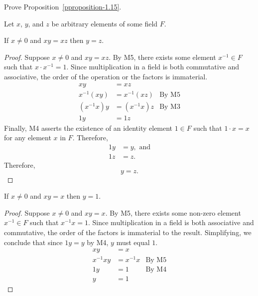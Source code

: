 \begin{exercise}
	Prove Proposition~\ref{pproposition-1.15}.
\end{exercise}
Let $x$, $y$, and $z$ be arbitrary elements of some field $F$.
\begin{proposition}
	If $x \neq 0$ and $xy = xz$ then $y = z$.
\end{proposition}
\begin{proof}
	Suppose $x \neq 0$ and $xy = xz$. By M5, there exists some element $x^{-1} \in F$ such that $x \cdot x^{-1} = 1$. Since multiplication in a field is both commutative and associative, the order of the operation or the factors is immaterial.
	\begin{align*}
	xy &= xz &\\
	x^{-1}\left(xy\right) &= x^{-1}\left(xz\right) &\text{By M5}\\
	\left( x^{-1}x \right)y &= \left( x^{-1}x \right) z &\text{By M3}\\
	1y &= 1z &
	\end{align*}
	Finally, M4 asserts the existence of an identity element $1 \in F$ such that $1 \cdot x = x$ for any element $x$ in $F$. Therefore,
	\begin{align*}
	1y &= y, \text{ and} \\
	1z &= z.
	\end{align*}
	Therefore,
	\begin{equation*}
	y = z.
	\end{equation*}
\end{proof}

\begin{proposition}
	If $x \neq 0$ and $xy = x$ then $y = 1$.
\end{proposition}
\begin{proof}
	Suppose $x \neq 0$ and $xy = x$. By M5, there exists some non-zero element $x^{-1} \in F$ such that $x^{-1}x = 1$. Since multiplication in a field is both associative and commutative, the order of the factors is immaterial to the result. Simplifying, we conclude that since $1y = y$ by M4, $y$ must equal $1$.
	\begin{align*}
	xy &= x & \\
	x^{-1}xy &= x^{-1}x &\text{By M5}\\
	1y &= 1 &\text{By M4}\\
	y &= 1 &
	\end{align*}
\end{proof}

